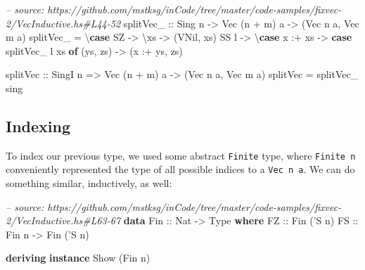 \documentclass[]{article}
\newenvironment{Shaded}{}{}
\newcommand{\KeywordTok}[1]{\textcolor[rgb]{0.00,0.44,0.13}{\textbf{#1}}}
\newcommand{\DataTypeTok}[1]{\textcolor[rgb]{0.56,0.13,0.00}{#1}}
\newcommand{\CharTok}[1]{\textcolor[rgb]{0.25,0.44,0.63}{#1}}
\newcommand{\CommentTok}[1]{\textcolor[rgb]{0.38,0.63,0.69}{\textit{#1}}}
\newcommand{\OtherTok}[1]{\textcolor[rgb]{0.00,0.44,0.13}{#1}}
\newcommand{\FunctionTok}[1]{\textcolor[rgb]{0.02,0.16,0.49}{#1}}
\newcommand{\NormalTok}[1]{#1}
\begin{document}
\begin{Shaded}
\begin{Highlighting}[]
\CommentTok{-- source: https://github.com/mstksg/inCode/tree/master/code-samples/fixvec-2/VecInductive.hs#L44-52}
\OtherTok{splitVec_ ::} \DataTypeTok{Sing}\NormalTok{ n }\OtherTok{->} \DataTypeTok{Vec}\NormalTok{ (n }\FunctionTok{+}\NormalTok{ m) a }\OtherTok{->}\NormalTok{ (}\DataTypeTok{Vec}\NormalTok{ n a, }\DataTypeTok{Vec}\NormalTok{ m a)}
\NormalTok{splitVec_ }\FunctionTok{=}\NormalTok{ \textbackslash{}}\KeywordTok{case}
    \DataTypeTok{SZ}   \OtherTok{->}\NormalTok{ \textbackslash{}xs }\OtherTok{->}\NormalTok{ (}\DataTypeTok{VNil}\NormalTok{, xs)}
    \DataTypeTok{SS}\NormalTok{ l }\OtherTok{->}\NormalTok{ \textbackslash{}}\KeywordTok{case}
\NormalTok{      x }\FunctionTok{:+}\NormalTok{ xs }\OtherTok{->} \KeywordTok{case}\NormalTok{ splitVec_ l xs }\KeywordTok{of}
\NormalTok{        (ys, zs) }\OtherTok{->}\NormalTok{ (x }\FunctionTok{:+}\NormalTok{ ys, zs)}


\OtherTok{splitVec ::} \DataTypeTok{SingI}\NormalTok{ n }\OtherTok{=>} \DataTypeTok{Vec}\NormalTok{ (n }\FunctionTok{+}\NormalTok{ m) a }\OtherTok{->}\NormalTok{ (}\DataTypeTok{Vec}\NormalTok{ n a, }\DataTypeTok{Vec}\NormalTok{ m a)}
\NormalTok{splitVec }\FunctionTok{=}\NormalTok{ splitVec_ sing}
\end{Highlighting}
\end{Shaded}

\subsection{Indexing}\label{indexing-1}

To index our previous type, we used some abstract \texttt{Finite} type, where
\texttt{Finite\ n} conveniently represented the type of all possible indices to
a \texttt{Vec\ n\ a}. We can do something similar, inductively, as well:

\begin{Shaded}
\begin{Highlighting}[]
\CommentTok{-- source: https://github.com/mstksg/inCode/tree/master/code-samples/fixvec-2/VecInductive.hs#L63-67}
\KeywordTok{data} \DataTypeTok{Fin}\OtherTok{ ::} \DataTypeTok{Nat} \OtherTok{->} \DataTypeTok{Type} \KeywordTok{where}
    \DataTypeTok{FZ}\OtherTok{ ::} \DataTypeTok{Fin}\NormalTok{ (}\CharTok{'S n)}
    \DataTypeTok{FS}\OtherTok{ ::} \DataTypeTok{Fin}\NormalTok{ n }\OtherTok{->} \DataTypeTok{Fin}\NormalTok{ (}\CharTok{'S n)}


\KeywordTok{deriving} \KeywordTok{instance} \DataTypeTok{Show}\NormalTok{ (}\DataTypeTok{Fin}\NormalTok{ n)}
\end{Highlighting}
\end{Shaded}
\end{document}
